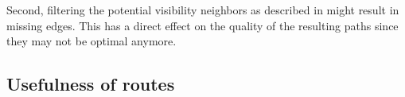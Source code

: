 		Second, filtering the potential visibility neighbors as described in  might result in missing edges.
		This has a direct effect on the quality of the resulting paths since they may not be optimal anymore.
		
	\subsection{Usefulness of routes}
	
